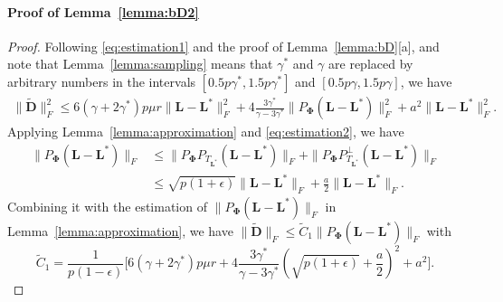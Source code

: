 \documentclass[12pt]{article}
\newcommand{\bL}{\boldsymbol{L}}
\newcommand{\bD}{\boldsymbol{D}}
\theoremstyle{plain}
\theoremstyle{definition}
\theoremstyle{plain}
\theoremstyle{plain}
\theoremstyle{remark}
\begin{document}
\paragraph*{Proof of Lemma~\ref{lemma:bD2}}
\begin{proof}
Following \eqref{eq:estimation1} and the proof of Lemma~\ref{lemma:bD}[a], and note that Lemma~\ref{lemma:sampling} means that $\gamma^*$ and $\gamma$ are replaced by arbitrary numbers in the intervals $[0.5 p \gamma^*, 1.5 p \gamma^*]$ and $[0.5p\gamma, 1.5p\gamma]$, we have
\begin{align*}
\|\tilde{\bD}\|_F^2\leq 6(\gamma+2\gamma^*)p\mu r \|\bL-\bL^*\|_F^2+4\frac{3\gamma^*}{\gamma-3\gamma^*}\|P_{\mathbf{\Phi}}(\bL-\bL^*)\|_F^2+a^2\|\bL-\bL^*\|_F^2.
\end{align*}
Applying Lemma~\ref{lemma:approximation} and \eqref{eq:estimation2}, we have
\begin{align*}
\|P_{\mathbf{\Phi}}(\bL-\bL^{*})\|_{F} & \leq\|P_{\mathbf{\Phi}}P_{T_{\bL^{*}}}(\bL-\bL^{*})\|_{F}+\|P_{\mathbf{\Phi}}P_{T_{\bL^{*}}}^{\perp}(\bL-\bL^{*})\|_{F}\\
 & \leq\sqrt{p(1+\epsilon)}\|\bL-\bL^{*}\|_{F}+\frac{a}{2}\|\bL-\bL^{*}\|_{F}.
\end{align*}
Combining it with the estimation of $\|P_{\mathbf{\Phi}}(\bL-\bL^*)\|_F$ in Lemma~\ref{lemma:approximation}, we have $\|\tilde{\bD}\|_F\leq \tilde{C}_1\|P_{\mathbf{\Phi}}(\bL-\bL^*)\|_F$ with
\[
\tilde{C}_1=\frac{1}{p(1-\epsilon)}\Big[6(\gamma+2\gamma^*)p\mu r+4\frac{3\gamma^*}{\gamma-3\gamma^*}(\sqrt{p(1+\epsilon)}+\frac{a}{2})^2+a^2\Big].
\]
\end{proof}
\end{document}
